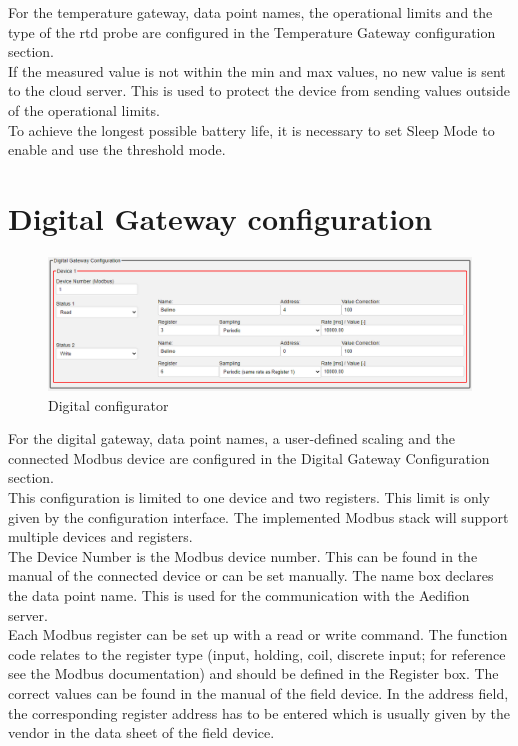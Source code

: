 \documentclass[10pt,letterpaper]{article}
\begin{document}
	For the temperature gateway, data point names, the operational limits and the type of the rtd probe are configured in the Temperature Gateway configuration section. \\

	If the measured value is not within the min and max values, no new value is sent to the cloud server. This is used to protect the device from sending values outside of the operational limits.\\
	
	To achieve the longest possible battery life, it is necessary to set Sleep Mode to enable and use the threshold mode. \\


\newpage
	\section{Digital Gateway configuration}
	\begin{figure}[ht!]
		\includegraphics[width=\textwidth]{Figures/2-digital.png}
		\caption{Digital configurator}
		\label{fig:d-configurator}
	\end{figure}
	For the digital gateway, data point names, a user-defined scaling and the connected Modbus device are configured in the Digital Gateway Configuration section. \\

	This configuration is limited to one device and two registers. This limit is only given by the configuration interface. The implemented Modbus stack will support multiple devices and registers.\\


	The Device Number is the Modbus device number. This can be found in the manual of the connected device or can be set manually.
	The name box declares the data point name. This is used for the communication with the Aedifion server.\\

	Each Modbus register can be set up with a read or write command. The function code relates to the register type (input, holding, coil, discrete input; for reference see the Modbus documentation) and should be defined in the Register box. The correct values can be found in the manual of the field device. In the address field, the corresponding register address has to be entered which is usually given by the vendor in the data sheet of the field device.\\
\end{document}
